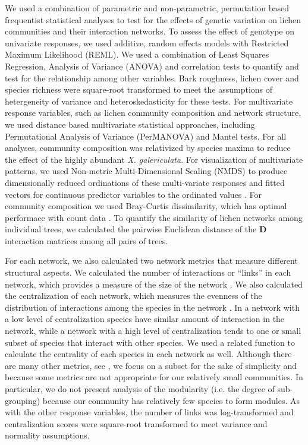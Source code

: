 \documentclass[9pt,twocolumn,twoside,lineno]{pnas-new}
\begin{document}
{We used a combination of parametric and non-parametric, permutation
based frequentist statistical analyses to test for the effects of
genetic variation on lichen communities and their interaction
networks. To assess the effect of genotype on univariate responses, we
used additive, random effects models with Restricted Maximum
Likelihood (REML). We used a combination of Least Squares Regression,
Analysis of Variance (ANOVA) and correlation tests to quantify and
test for the relationship among other variables. Bark roughness,
lichen cover and species richness were square-root transformed to meet
the assumptions of hetergeneity of variance and heteroskedasticity for
these tests. For multivariate response variables, such as lichen
community composition and network structure, we used distance based
multivariate statistical approaches, including Permutational Analysis
of Variance (PerMANOVA) and Mantel tests. For all analyses, community
composition was relativized by species maxima to reduce the effect of
the highly abundant \textit{X. galericulata}. For visualization of
multivariate patterns, we used Non-metric Multi-Dimensional Scaling
(NMDS) \cite{ecodist} to produce dimensionally reduced ordinations of
these multi-variate responses and fitted vectors for continuous
predictor variables to the ordinated values \cite{vegan}. For
community composition we used Bray-Curtis dissimilarity, which has
optimal performace with count data \citep{Minchen1998}. To quantify
the similarity of lichen networks among individual trees, we
calculated the pairwise Euclidean distance of the $\mathbf{D}$
interaction matrices among all pairs of trees.


For each network, we also calculated two network metrics that measure
different structural aspects. We calculated the number of interactions
or ``links'' in each network, which provides a measure of the size of
the network \citep{Lau2014, Borrett2015}. We also calculated the
centralization of each network, which measures the evenness of the
distribution of interactions among the species in the network
\cite{Butts2005}. In a network with a low level of centralization
species have similar amount of interaction in the network, while a
network with a high level of centralization tends to one or small
subset of species that interact with other species. We used a related
function to calculate the centrality of each species in each network
as well. Although there are many other metrics, see \citep{Lau2016},
we focus on a subset for the sake of simplicity and because some
metrics are not appropriate for our relatively small communities. In
particular, we do not present analysis of the modularity (i.e. the
degree of sub-grouping) because our community has relatively few
species to form modules. As with the other response variables, the
number of links was log-transformed and centralization scores were
square-root transformed to meet variance and normality assumptions.

}
\end{document}
